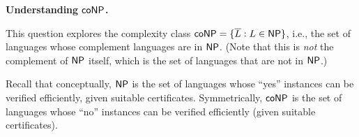 \documentclass[11pt,addpoints]{exam}
\begin{document}
\begin{questions}
  \question \textbf{Understanding $\textsf{coNP}$.}
  
  This question explores the complexity class $\textsf{coNP} = \{\overline{L} : L\in\textsf{NP}\}$, i.e., the set of languages whose complement languages are in $\textsf{NP}$.
  (Note that this is \emph{not} the complement of $\textsf{NP}$ itself, which is the set of languages that are not in $\textsf{NP}$.)
  
  Recall that conceptually, $\textsf{NP}$ is the set of languages whose ``yes'' instances can be verified efficiently, given suitable certificates.
  Symmetrically, $\textsf{coNP}$ is the set of languages whose ``no'' instances can be verified efficiently (given suitable certificates).
    
  

\end{questions}
\end{document}
